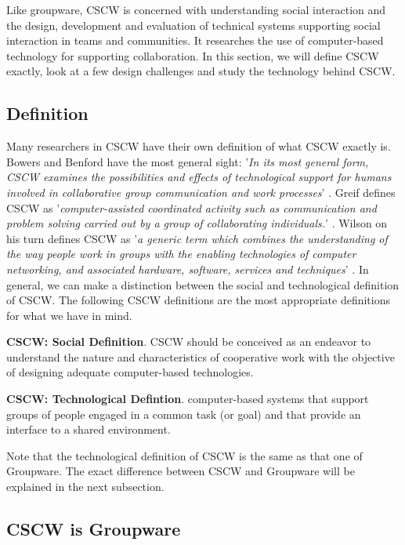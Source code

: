Like groupware, CSCW is concerned with understanding social interaction and the design, development and evaluation of technical systems supporting social interaction in teams and communities. It researches the use of computer-based technology for supporting collaboration. In this section, we will define CSCW exactly, look at a few design challenges and study the technology behind CSCW.

\subsection{Definition}

Many researchers in CSCW have their own definition of what CSCW exactly is. Bowers and Benford have the most general sight: '\textit{In its most general form, CSCW examines the possibilities and effects of technological support for humans involved in collaborative group communication and work processes}' \cite{StudyCSCW}. Greif defines CSCW as '\textit{computer-assisted coordinated activity such as communication and problem solving carried out by a group of collaborating individuals.}' \cite{CSCWReadings}. Wilson on his turn defines CSCW as '\textit{a generic term which combines the understanding of the way people work in groups with the enabling technologies of computer networking, and associated hardware, software, services and techniques}' \cite{CSCWIntro}. In general, we can make a distinction between the social and technological definition of CSCW. The following CSCW definitions are the most appropriate definitions for what we have in mind.
\begin{mydef}
\textbf{CSCW: Social Definition}. CSCW should be conceived as an endeavor to understand the nature and characteristics of cooperative work with the objective of designing adequate computer-based technologies. \cite{CSCWChars}
\end{mydef}
\begin{mydef}
\textbf{CSCW: Technological Defintion}. computer-based systems that support groups of people engaged in a common task (or goal) and that provide an interface to a shared environment. \cite{CSCWGroupware}
\end{mydef}
Note that the technological definition of CSCW is the same as that one of Groupware. The exact difference between CSCW and Groupware will be explained in the next subsection.

\subsection{CSCW is Groupware}

